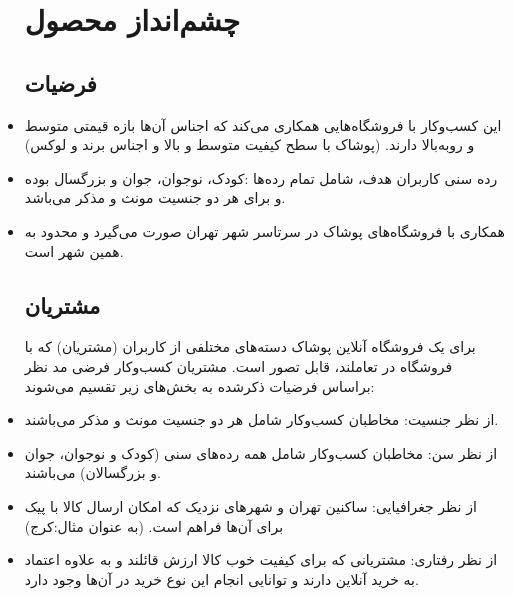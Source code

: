 \documentclass[14pt]{article}
\begin{document}
\begin{flushright}
\begin{itemize}
\section{ چشم‌انداز محصول}

\subsection{فرضیات}

\item این کسب‌و‌کار با فروشگاه‌هایی همکاری می‌کند که اجناس آن‌ها بازه قیمتی متوسط و روبه‌بالا دارند. (پوشاک با سطح کیفیت متوسط و بالا و اجناس برند و لوکس)
\item رده سنی کاربران هدف، شامل تمام رده‌ها :‌کودک، نوجوان، جوان و بزرگسال بوده و برای هر دو جنسیت مونث و مذکر می‌باشد.
\item همکاری با فروشگاه‌های پوشاک در سرتاسر شهر تهران صورت می‌گیرد و محدود به همین شهر است.

\subsection{مشتریان}


برای یک فروشگاه آنلاین پوشاک دسته‌های مختلفی از کاربران (مشتریان) که با فروشگاه در تعاملند،‌ قابل تصور است. مشتریان کسب‌و‌کار فرضی مد نظر براساس فرضیات ذکرشده به بخش‌های زیر تقسیم می‌شوند:
\item از نظر جنسیت: مخاطبان کسب‌و‌کار شامل هر دو جنسیت مونث و مذکر می‌باشند.
\item از نظر سن:‌ مخاطبان کسب‌و‌کار شامل همه رده‌های سنی (کودک و نوجوان، جوان و بزرگسالان) می‌باشند.
\item از نظر جغرافیایی: ساکنین تهران و شهرهای نزدیک که امکان ارسال کالا با پیک برای آن‌ها فراهم است. (به عنوان مثال:‌کرج)
\item از نظر رفتاری‌: مشتریانی که برای کیفیت خوب کالا ارزش قائلند و به علاوه اعتماد به خرید آنلاین دارند و توانایی انجام این نوع خرید در آن‌ها وجود دارد.



\end{itemize}
\end{flushright}
\end{document}
